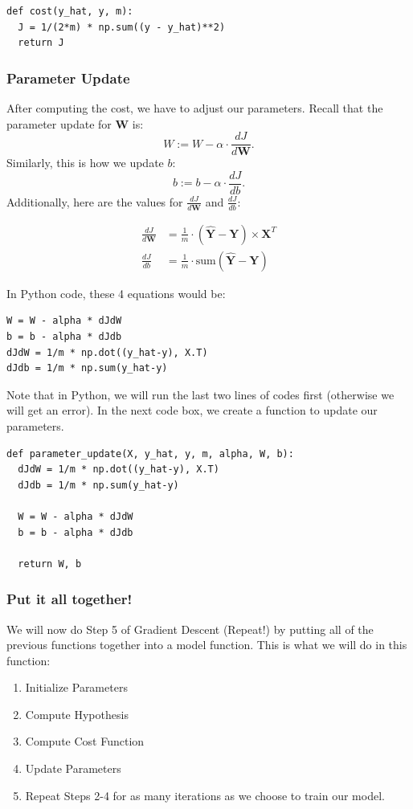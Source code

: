 \documentclass{article}
\begin{document}
\begin{lstlisting}
def cost(y_hat, y, m):
  J = 1/(2*m) * np.sum((y - y_hat)**2)
  return J
\end{lstlisting}

\subsubsection{Parameter Update}
After computing the cost, we have to adjust our parameters. Recall that the parameter update for $\textbf{W}$ is:
$$W:=W-\alpha\cdot \frac{dJ}{d\textbf{W}}.$$
Similarly, this is how we update $b$:
$$b:=b-\alpha\cdot \frac{dJ}{db}.$$
Additionally, here are the values for $\frac{dJ}{d\textbf{W}}$ and $\frac{dJ}{db}$:

\begin{align*}
\frac{dJ}{d\textbf{W}}&=\frac{1}{m}\cdot (\hat{\textbf{Y}}-\textbf{Y})\times \textbf{X}^T\\
\frac{dJ}{db}&=\frac{1}{m}\cdot \text{sum}(\hat{\textbf{Y}}-\textbf{Y})
\end{align*}

\noindent In Python code, these 4 equations would be:
\begin{lstlisting}
W = W - alpha * dJdW
b = b - alpha * dJdb
dJdW = 1/m * np.dot((y_hat-y), X.T)
dJdb = 1/m * np.sum(y_hat-y)
\end{lstlisting}
Note that in Python, we will run the last two lines of codes first (otherwise we will get an error). In the next code box, we create a function to update our parameters.
\begin{lstlisting}
def parameter_update(X, y_hat, y, m, alpha, W, b):
  dJdW = 1/m * np.dot((y_hat-y), X.T)
  dJdb = 1/m * np.sum(y_hat-y)

  W = W - alpha * dJdW
  b = b - alpha * dJdb

  return W, b
\end{lstlisting}

\subsubsection{Put it all together!}
We will now do Step 5 of Gradient Descent (Repeat!) by putting all of the previous functions together into a model function. This is what we will do in this function:
\begin{enumerate}
    \item Initialize Parameters
    \item Compute Hypothesis
    \item Compute Cost Function
    \item Update Parameters
    \item Repeat Steps 2-4 for as many iterations as we choose to train our model.
\end{enumerate}
\end{document}
